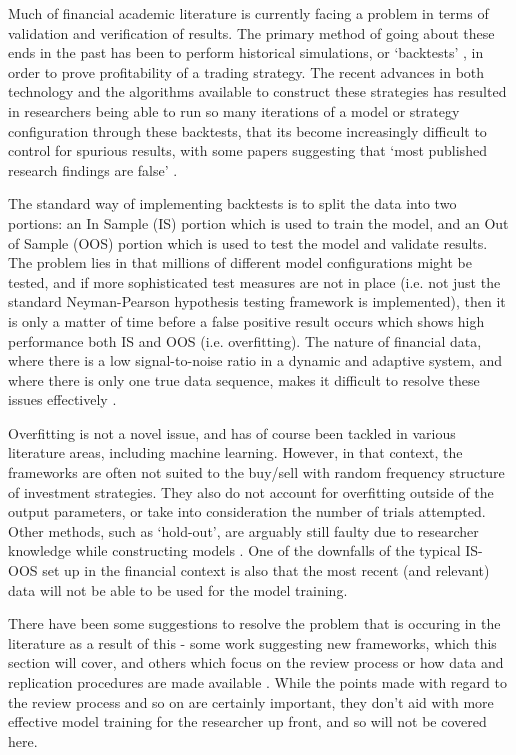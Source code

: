 \documentclass[a4paper,11pt,oneside]{article}
\theoremstyle{plain}
\theoremstyle{definition}
\begin{document}
Much of financial academic literature is currently facing a problem in terms of validation and verification of results. 
The primary method of going about these ends in the past has been to perform historical simulations, or ‘backtests’ ,
in order to prove profitability of a trading strategy. The recent advances in both technology and the algorithms available 
to construct these strategies has resulted in researchers being able to run so many iterations of a model or strategy
 configuration through these backtests, that its become increasingly difficult to control for spurious results, with some 
 papers suggesting that ‘most published research findings are false’   \cite{Ioannidis}.
\hfill \break 

The standard way of implementing backtests is to split the data into two portions: an In Sample (IS) portion which
 is used to train the model, and an Out of Sample (OOS) portion which is used to test the model and validate results. 
 The problem lies in that millions of different model configurations might be tested, and if more sophisticated test 
 measures are not in place (i.e. not just the standard Neyman-Pearson hypothesis testing framework is implemented), 
 then it is only a matter of time before a false positive result occurs which shows high performance both IS and OOS (i.e. overfitting). 
 The nature of financial data, where there is a low signal-to-noise ratio in a dynamic and adaptive system, and 
 where there is only one true data sequence, makes it difficult to resolve these issues effectively 
\cite{BailyPBO, McLean}.
\hfill \break 

Overfitting is not a novel issue, and has of course been tackled in various literature areas, including machine learning. 
However, in that context, the frameworks are often not suited to the buy/sell with random frequency structure of 
investment strategies. They also do not account for overfitting outside of the output parameters, or take into 
consideration the number of trials attempted. Other methods, such as ‘hold-out’, are arguably still faulty due to researcher 
knowledge while constructing models \cite{Schorfheide}. One of the downfalls of the typical IS-OOS set up in the 
financial context is also that the most recent (and relevant) data will not be able to be used for the model training. 
\hfill \break 

There have been some suggestions to resolve the problem that is occuring in the literature as a result of this - some 
work suggesting new frameworks, which this section will cover, and others which focus on the review process or 
how data and replication procedures are made available \cite{Prado}. While the points made with regard to the review process 
and so on are certainly important, they don't aid with more effective model training for the researcher up front, and 
so will not be covered here.
\end{document}
